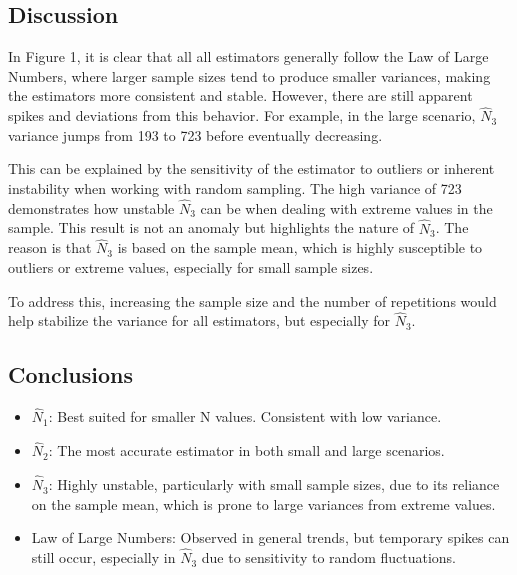 \documentclass{report}
\begin{document}
\subsection{Discussion}

\begin{comment}
Figure 1 shows the mean estimations from the two experiments. The upper part of the figure for the small scenario and the lower part for the large scenario. It is observed that for all estimators, the variance decreases as the sample size increases, which aligns with the formula derived from the Central Limit Theorem. 
\end{comment}

In Figure 1, it is clear that all all estimators generally follow the Law of Large Numbers, where larger sample sizes tend to produce smaller variances, making the estimators more consistent and stable. However, there are still apparent spikes and deviations from this behavior. For example, in the large scenario, $\hat{N}_3$ variance jumps from 193 to 723 before eventually decreasing.

This can be explained by the sensitivity of the estimator to outliers or inherent instability when working with random sampling. The high variance of 723 demonstrates how unstable $\hat{N}_3$ can be when dealing with extreme values in the sample. This result is not an anomaly but highlights the nature of $\hat{N}_3$. The reason is that $\hat{N}_3$ is based on the sample mean, which is highly susceptible to outliers or extreme values, especially for small sample sizes.

To address this, increasing the sample size and the number of repetitions would help stabilize the variance for all estimators, but especially for $\hat{N}_3$.


\subsection{Conclusions}

\begin{itemize}
    \item $\hat{N}_1$: Best suited for smaller N values. Consistent with low variance. 
    \item $\hat{N}_2$: The most accurate estimator in both small and large scenarios.
    \item $\hat{N}_3$: Highly unstable, particularly with small sample sizes, due to its reliance on the sample mean, which is prone to large variances from extreme values.
    \item Law of Large Numbers: Observed in general trends, but temporary spikes can still occur, especially in $\hat{N}_3$ due to sensitivity to random fluctuations.
\end{itemize}
\end{document}

